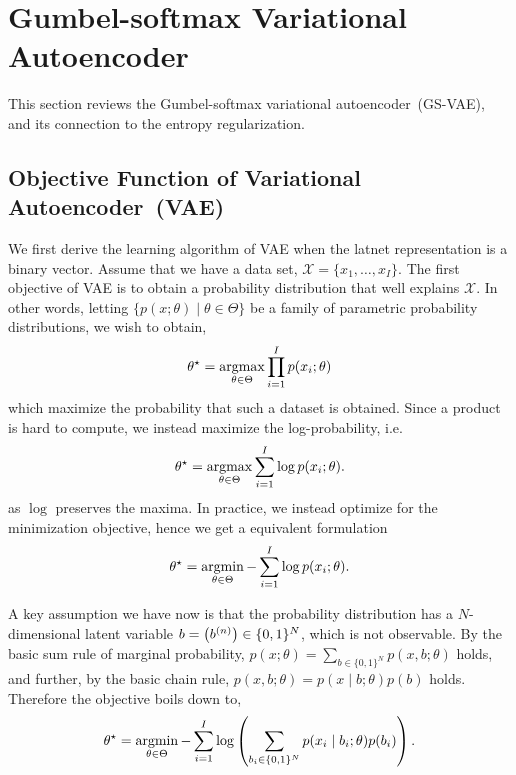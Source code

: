 \documentclass[10pt,letterpaper]{article}
\newcommand{\argmin}{\mathop{\rm argmin}}
\newcommand{\argmax}{\mathop{\rm argmax}}
\begin{document}
\section{Gumbel-softmax Variational Autoencoder}
This section reviews the Gumbel-softmax variational autoencoder~(GS-VAE), and its connection to the entropy regularization.

\subsection{Objective Function of Variational Autoencoder~(VAE)}
We first derive the learning algorithm of VAE when the latnet representation is a binary vector.
Assume that we have a data set, $\mathcal{X}=\{x_1,\dots,x_I\}$.
The first objective of VAE is to obtain a probability distribution that well explains $\mathcal{X}$.
In other words, letting $\{p(x;\theta) \mid \theta\in\Theta\}$ be a family of parametric probability distributions, we wish to obtain,
\begin{align*}
\theta^\star = \argmax_{\theta\in\Theta} \prod_{i=1}^I p(x_i;\theta)
\end{align*}
which maximize the probability that such a dataset is obtained. Since a product is hard to compute, we instead maximize the log-probability, i.e.
\begin{align*}
\theta^\star = \argmax_{\theta\in\Theta} \sum_{i=1}^I \log p(x_i;\theta).
\end{align*}
as $\log$ preserves the maxima.
In practice, we instead optimize for the minimization objective, hence we get a equivalent formulation
\begin{align*}
\theta^\star = \argmin_{\theta\in\Theta} - \sum_{i=1}^I \log p(x_i;\theta).
\end{align*}


A key assumption we have now is that the probability distribution has a $N$-dimensional latent variable $b={\left(b^{(n)}\right)}\in\{0,1\}^N$, which is not observable.
By the basic sum rule of marginal probability,
$p(x;\theta) = \sum_{b\in\{0,1\}^N}p(x, b;\theta)$ holds, and further,
by the basic chain rule,
$p(x, b;\theta) = p(x \mid b;\theta)p(b)$ holds.
Therefore the objective boils down to,
\begin{align}
\label{eq:vae-obj} \theta^\star = \argmin_{\theta\in\Theta} -\sum_{i=1}^I \log \left(\sum_{b_i\in\{0,1\}^N}p(x_i \mid b_i;\theta)p(b_i)\right).
\end{align}
\end{document}
